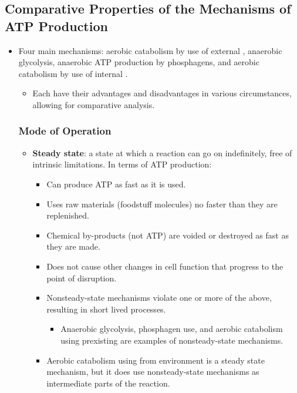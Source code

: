 \documentclass[12pt,a4paper]{article}
\begin{document}
\subsection{Comparative Properties of the Mechanisms of ATP Production}
\begin{itemize}
    \item Four main mechanisms: aerobic catabolism by use of external , anaerobic glycolysis, anaerobic ATP production by phosphagens, and aerobic catabolism by use of internal .
        \begin{itemize}
            \item Each have their advantages and disadvantages in various circumstances, allowing for comparative analysis.
        \end{itemize}
    \subsubsection{Mode of Operation}
    \begin{itemize}
        \item \textbf{Steady state}: a state at which a reaction can go on indefinitely, free of intrinsic limitations. In terms of ATP production:
            \begin{itemize}
                \item Can produce ATP as fast as it is used. 
                \item Uses raw materials (foodstuff molecules) no faster than they are replenished.
                \item Chemical by-products (not ATP) are voided or destroyed as fast as they are made.
                \item Does not cause other changes in cell function that progress to the point of disruption.
                \item Nonsteady-state mechanisms violate one or more of the above, resulting in short lived processes.
                    \begin{itemize}
                        \item Anaerobic glycolysis, phosphagen use, and aerobic catabolism using prexisting  are examples of nonsteady-state mechanisms.
                    \end{itemize}
                \item Aerobic catabolism using  from environment is a steady state mechanism, but it does use nonsteady-state mechanisms as intermediate parts of the reaction.
            \end{itemize}
    \end{itemize}

\end{itemize}
\end{document}

